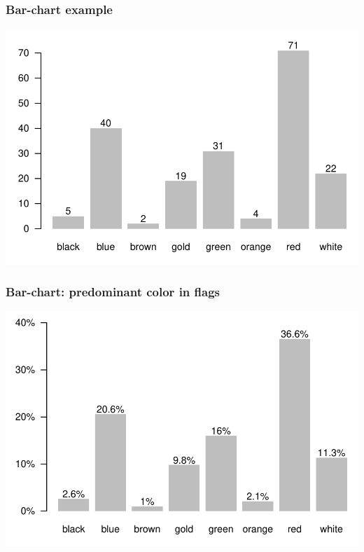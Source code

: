 \documentclass[12pt]{beamer}\usepackage[]{graphicx}\usepackage[]{color}
\newenvironment{knitrout}{}{} %
\begin{document}
\begin{frame}[fragile]
\frametitle{Bar-chart example}

\begin{knitrout}\footnotesize
{}\color{fgcolor}

{\centering \includegraphics[width=.8\linewidth,height=.6\linewidth]{figure/unnamed-chunk-4-1} 

}



\end{knitrout}

\end{frame}


\begin{frame}[fragile]
\frametitle{Bar-chart: predominant color in flags}

\begin{knitrout}\footnotesize
{}\color{fgcolor}

{\centering \includegraphics[width=.8\linewidth,height=.6\linewidth]{figure/unnamed-chunk-5-1} 

}



\end{knitrout}

\end{frame}
\end{document}

